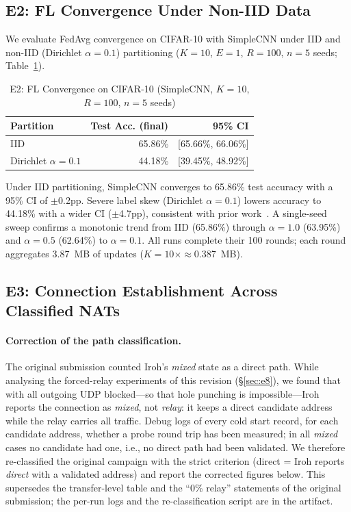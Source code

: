 \documentclass[a4paper,fleqn]{cas-dc}
\begin{document}
\subsection{E2: FL Convergence Under Non-IID Data}
\label{sec:e2}

We evaluate FedAvg convergence on CIFAR-10 with SimpleCNN under IID and non-IID (Dirichlet $\alpha{=}0.1$) partitioning ($K{=}10$, $E{=}1$, $R{=}100$, $n{=}5$ seeds; Table~\ref{tab:e2}).

\begin{table}[t]
\centering
\caption{E2: FL Convergence on CIFAR-10 (SimpleCNN, $K{=}10$, $R{=}100$, $n{=}5$ seeds)}
\label{tab:e2}
\footnotesize
\begin{tabular}{l r r}
\toprule
\textbf{Partition} & \textbf{Test Acc. (final)} & \textbf{95\% CI} \\
\midrule
IID                  & 65.86\% & [65.66\%, 66.06\%] \\
Dirichlet $\alpha{=}0.1$ & 44.18\% & [39.45\%, 48.92\%] \\
\bottomrule
\end{tabular}
\end{table}

Under IID partitioning, SimpleCNN converges to 65.86\% test accuracy with a 95\% CI of $\pm$0.2pp. Severe label skew (Dirichlet $\alpha{=}0.1$) lowers accuracy to 44.18\% with a wider CI ($\pm$4.7pp), consistent with prior work~\cite{li2020federated,scaffold2020}. A single-seed sweep confirms a monotonic trend from IID (65.86\%) through $\alpha{=}1.0$ (63.95\%) and $\alpha{=}0.5$ (62.64\%) to $\alpha{=}0.1$. All runs complete their 100 rounds; each round aggregates 3.87~MB of updates ($K{=}10 \times \approx$0.387~MB).

\subsection{E3: Connection Establishment Across Classified NATs}
\label{sec:e3}

\paragraph{Correction of the path classification.} The original submission counted Iroh's \emph{mixed} state as a direct path. While analysing the forced-relay experiments of this revision (\S\ref{sec:e8}), we found that with all outgoing UDP blocked---so that hole punching is impossible---Iroh reports the connection as \emph{mixed}, not \emph{relay}: it keeps a direct candidate address while the relay carries all traffic. Debug logs of every cold start record, for each candidate address, whether a probe round trip has been measured; in all \emph{mixed} cases no candidate had one, i.e., no direct path had been validated. We therefore re-classified the original campaign with the strict criterion (direct = Iroh reports \emph{direct} with a validated address) and report the corrected figures below. This supersedes the transfer-level table and the ``0\% relay'' statements of the original submission; the per-run logs and the re-classification script are in the artifact.
\end{document}
